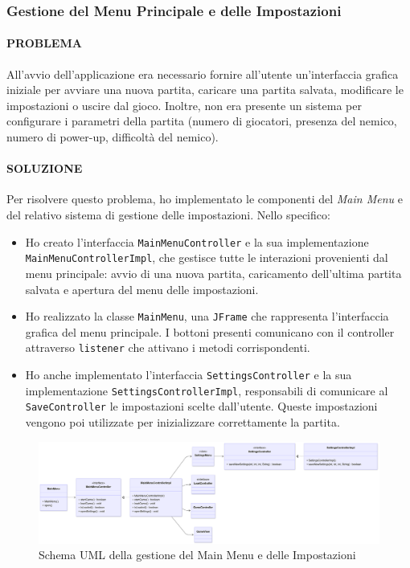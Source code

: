 \documentclass[a4paper,12pt]{report}
\begin{document}
\newpage
\subsubsection*{Gestione del Menu Principale e delle Impostazioni}

\paragraph{PROBLEMA}  
All'avvio dell'applicazione era necessario fornire all’utente un'interfaccia grafica iniziale per avviare una nuova partita, caricare una partita salvata, modificare le impostazioni o uscire dal gioco. Inoltre, non era presente un sistema per configurare i parametri della partita (numero di giocatori, presenza del nemico, numero di power-up, difficoltà del nemico).

\paragraph{SOLUZIONE}  
Per risolvere questo problema, ho implementato le componenti del \textit{Main Menu} e del relativo sistema di gestione delle impostazioni.
Nello specifico:
\begin{itemize}
    \item Ho creato l’interfaccia \texttt{MainMenuController} e la sua implementazione \texttt{MainMenuControllerImpl}, che gestisce tutte le interazioni provenienti dal menu principale: avvio di una nuova partita, caricamento dell’ultima partita salvata e apertura del menu delle impostazioni.
    \item Ho realizzato la classe \texttt{MainMenu}, una \texttt{JFrame} che rappresenta l'interfaccia grafica del menu principale. I bottoni presenti comunicano con il controller attraverso \texttt{listener} che attivano i metodi corrispondenti.
    \item Ho anche implementato l’interfaccia \texttt{SettingsController} e la sua implementazione \texttt{SettingsControllerImpl}, responsabili di comunicare al \texttt{SaveController} le impostazioni scelte dall’utente. Queste impostazioni vengono poi utilizzate per inizializzare correttamente la partita.
\end{itemize}
\begin{figure}[H]
	\centering{}
	\includegraphics[width=14cm]{img/MainMenu.png}
	\caption{Schema UML della gestione del Main Menu e delle Impostazioni}
	\label{img:Gestione MainMenu}
\end{figure}
\end{document}
